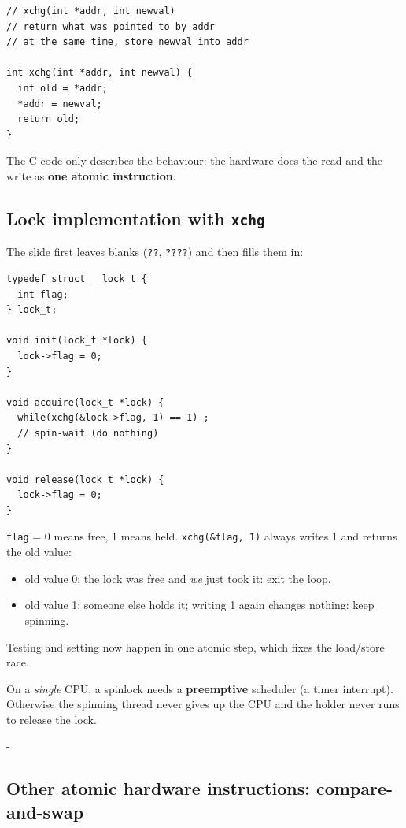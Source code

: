 \documentclass[11pt,a4paper]{article}
\makeatletter
\newcommand{\keepspace}[1]{\par\penalty-100\begingroup
  \setlength{\dimen@}{#1}\dimen@ii\pagegoal\advance\dimen@ii-\pagetotal
  \ifdim\dimen@>\dimen@ii\ifdim\dimen@ii>\z@\vfil\fi\break\fi\endgroup}
\makeatother
\begin{document}
\begin{lstlisting}
// xchg(int *addr, int newval)
// return what was pointed to by addr
// at the same time, store newval into addr

int xchg(int *addr, int newval) {
  int old = *addr;
  *addr = newval;
  return old;
}
\end{lstlisting}

The C code only describes the behaviour: the hardware does the read and the
write as \textbf{one atomic instruction}.

\subsection{Lock implementation with \texttt{xchg}}

The slide first leaves blanks (\texttt{??}, \texttt{????}) and then fills
them in:

\begin{lstlisting}
typedef struct __lock_t {
  int flag;
} lock_t;

void init(lock_t *lock) {
  lock->flag = 0;
}

void acquire(lock_t *lock) {
  while(xchg(&lock->flag, 1) == 1) ;
  // spin-wait (do nothing)
}

void release(lock_t *lock) {
  lock->flag = 0;
}
\end{lstlisting}

\begin{keybox}
\texttt{flag} = 0 means free, 1 means held. \texttt{xchg(\&flag, 1)}
always writes 1 and returns the old value:
\begin{itemize}
  \item old value 0: the lock was free and \emph{we} just took it: exit the
        loop.
  \item old value 1: someone else holds it; writing 1 again changes nothing:
        keep spinning.
\end{itemize}
Testing and setting now happen in one atomic step, which fixes the
load/store race.

On a \emph{single} CPU, a spinlock needs a \textbf{preemptive} scheduler (a
timer interrupt). Otherwise the spinning thread never gives up the CPU and
the holder never runs to release the lock.
\end{keybox}

\keepspace{18\baselineskip}
\subsection{Other atomic hardware instructions: compare-and-swap}
\end{document}
